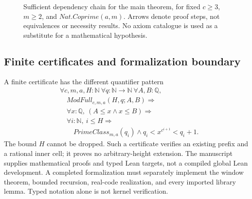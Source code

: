 \documentclass[11pt,reqno]{amsart}
\makeatletter
\newcommand{\N}{\mathbb N}
\newcommand{\Q}{\mathbb Q}
\newcommand{\R}{\mathbb R}
\theoremstyle{blueplain}
\newcounter{type}
\newcommand{\defref}[1]{\hyperref[#1]{Definition~\ref*{#1}}}
\numberwithin{equation}{section}
\DeclareRobustCommand{\defref}[1]{%
  \hyperlink{def:#1}{\ensuremath{\csname PredicateName@#1\endcsname}}}
\def\defref#1{#1}%
\def\hyperlink#1#2{#2}}
\makeatother
\begin{document}
\begin{figure}[H]
\centering\hypertarget{term:GRH}{}
\caption{Sufficient dependency chain for the main theorem, for fixed
$c\ge3$, $m\ge2$, and $\defref{Nat.Coprime}(a,m)$.
Arrows denote proof steps, not equivalences or necessity results.
No axiom catalogue is used as a substitute for a mathematical hypothesis.}
\label{fig:typed-main-dependencies}
\end{figure}

\subsection{Finite certificates and formalization boundary}
A finite certificate has the different quantifier pattern
\[
\begin{aligned}
&\forall c,m,a,H:\N\ \forall q:\N\to\N\ \forall A,B:\Q,\\
&\quad\defref{ModFull}_{c,m,a}(H,q;A,B)\Rightarrow\\
&\quad\forall x:\Q,\ (A\le x\wedge x\le B)\Rightarrow\\
&\quad\forall i:\N,\ i\le H\Rightarrow\\
&\qquad\defref{PrimeClass}_{m,a}(q_i)\wedge q_i<x^{c^{i+1}}<q_i+1.
\end{aligned}
\]
The bound $H$ cannot be dropped. Such a certificate verifies an existing
prefix and a rational inner cell; it proves no arbitrary-height extension.
The manuscript supplies mathematical proofs and typed Lean targets, not a
compiled global Lean development. A completed formalization must separately
implement the window theorem, bounded recursion, real-code realization,
and every imported library lemma. Typed notation alone is not kernel verification.
\end{document}
